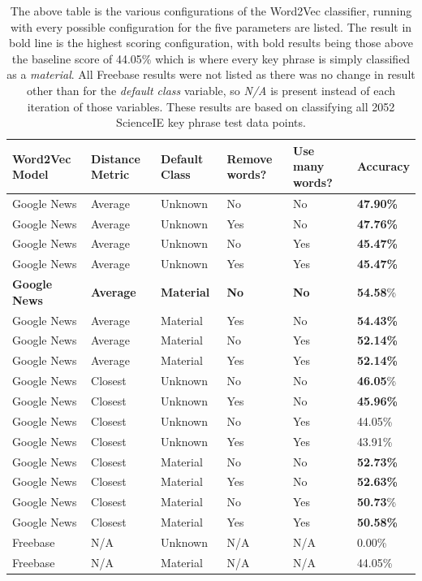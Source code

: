 \begin{table}
	\centering
	\begin{tabular}{ C{2.5cm} | C{2cm} | C{2cm} | C{2cm} | C{2cm} | C{2cm} }
		\textbf{Word2Vec Model} & \textbf{Distance Metric} & \textbf{Default Class} & \textbf{Remove words?} & \textbf{Use many words?} & \textbf{Accuracy} \\
		\hline
		Google News & Average & Unknown & No & No & \textbf{47.90\%} \\
		Google News & Average & Unknown & Yes & No & \textbf{47.76\%} \\
		Google News & Average & Unknown & No & Yes & \textbf{45.47\%} \\
		Google News & Average & Unknown & Yes & Yes & \textbf{45.47\%} \\
		\textbf{Google News} & \textbf{Average} & \textbf{Material} & \textbf{No} & \textbf{No} & \textbf{54.58}\% \\
		Google News & Average & Material & Yes & No & \textbf{54.43\%} \\
		Google News & Average & Material & No & Yes & \textbf{52.14\%} \\
		Google News & Average & Material & Yes & Yes  & \textbf{52.14\%} \\
		Google News & Closest & Unknown & No & No & \textbf{46.05}\% \\
		Google News & Closest & Unknown & Yes & No & \textbf{45.96\%} \\
		Google News & Closest & Unknown & No & Yes & 44.05\% \\
		Google News & Closest & Unknown & Yes & Yes & 43.91\% \\
		Google News & Closest & Material & No & No & \textbf{52.73\%} \\
		Google News & Closest & Material & Yes & No & \textbf{52.63\%} \\
		Google News & Closest & Material & No & Yes & \textbf{50.73}\% \\
		Google News & Closest & Material & Yes & Yes & \textbf{50.58\%} \\
		Freebase & N/A & Unknown & N/A & N/A & 0.00\% \\
		Freebase & N/A & Material & N/A & N/A & 44.05\% \\
	\end{tabular}
	\caption[Word2Vec Classification Results]{The above table is the various configurations of the Word2Vec classifier, running with every possible configuration for the five parameters are listed. The result in bold line is the highest scoring configuration, with bold results being those above the baseline score of 44.05\% which is where every key phrase is simply classified as a \textit{material}. All Freebase results were not listed as there was no change in result other than for the \textit{default class} variable, so \textit{N/A} is present instead of each iteration of those variables. These results are based on classifying all 2052 ScienceIE key phrase test data points.}
	\label{table:classresults}
\end{table}

